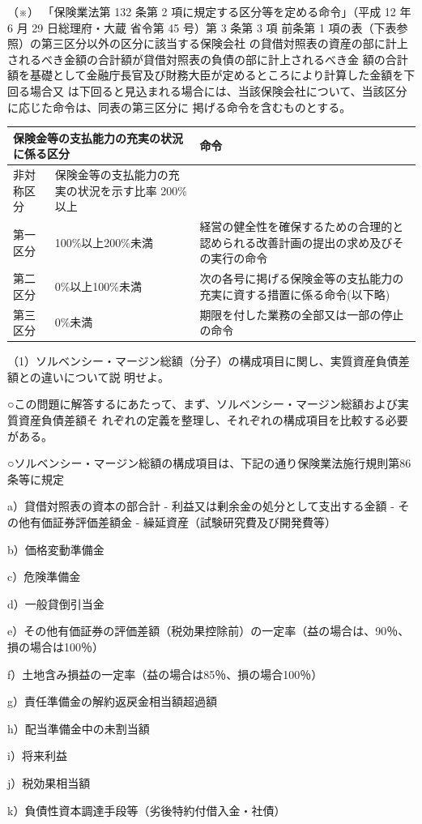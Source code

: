 \documentclass[report,gutter=10mm,fore-edge=10mm,uplatex,dvipdfmx]{jlreq}
\begin{document}
（※）
「保険業法第 132 条第 2 項に規定する区分等を定める命令」（平成 12 年 6 月 29 日総理府・大蔵
省令第 45 号）第 3 条第 3 項 前条第 1 項の表（下表参照）の第三区分以外の区分に該当する保険会社
の貸借対照表の資産の部に計上されるべき金額の合計額が貸借対照表の負債の部に計上されるべき金
額の合計額を基礎として金融庁長官及び財務大臣が定めるところにより計算した金額を下回る場合又
は下回ると見込まれる場合には、当該保険会社について、当該区分に応じた命令は、同表の第三区分に
掲げる命令を含むものとする。
\begin{tabularx}{\textwidth}{|l|X|X|}
\hline
 \multicolumn{2}{|l|}{保険金等の支払能力の充実の状況に係る区分} & 命令 \\ \hline
 非対称区分&保険金等の支払能力の充実の状況を示す比率 200\%以上& \\ \hline
第一区分& 100\%以上200\%未満 &経営の健全性を確保するための合理的と認められる改善計画の提出の求め及びその実行の命令\\ \hline
 第二区分& 0\%以上100\%未満&次の各号に掲げる保険金等の支払能力の充実に資する措置に係る命令(以下略)\\ \hline
 第三区分& 0\%未満&期限を付した業務の全部又は一部の停止の命令\\ \hline
\end{tabularx}
\answer{}
（1）ソルベンシー・マージン総額（分子）の構成項目に関し、実質資産負債差額との違いについて説
明せよ。

○この問題に解答するにあたって、まず、ソルベンシー・マージン総額および実質資産負債差額そ
れぞれの定義を整理し、それぞれの構成項目を比較する必要がある。

○ソルベンシー・マージン総額の構成項目は、下記の通り保険業法施行規則第86条等に規定

a）貸借対照表の資本の部合計  -  利益又は剰余金の処分として支出する金額  -  その他有価証券評価差額金
 -  繰延資産（試験研究費及び開発費等）

b）価格変動準備金

c）危険準備金

d）一般貸倒引当金

e）その他有価証券の評価差額（税効果控除前）の一定率（益の場合は、90％、損の場合は100％）

f）土地含み損益の一定率（益の場合は85％、損の場合100％）

g）責任準備金の解約返戻金相当額超過額

h）配当準備金中の未割当額

i）将来利益

j）税効果相当額

k）負債性資本調達手段等（劣後特約付借入金・社債）
\end{document}
